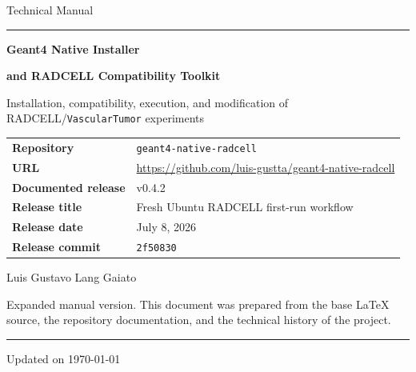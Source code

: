 \documentclass[11pt,a4paper,twoside,pdftex]{refrep}
\newcommand{\RepositoryName}{\texttt{geant4-native-radcell}}
\newcommand{\RepositoryURL}{\url{https://github.com/luis-gustta/geant4-native-radcell}}
\newcommand{\RepositoryVersion}{v0.4.2}
\newcommand{\RepositoryReleaseTitle}{Fresh Ubuntu RADCELL first-run workflow}
\newcommand{\RepositoryReleaseDate}{July 8, 2026}
\newcommand{\RepositoryReleaseCommit}{2f50830}
\begin{document}
\begin{titlepage}
  \thispagestyle{empty}

  \vspace*{1.0cm}

  \noindent\hspace*{-\leftmarginwidth}%
\begin{minipage}{\fullwidth}
{\LARGE Technical Manual\par}

\vspace{0.32cm}

\noindent\rule{\fullwidth}{0.8pt}\par
\end{minipage}

  \vspace{1.2cm}

  {\Huge\bfseries Geant4 Native Installer}

  {\Huge\bfseries and RADCELL Compatibility Toolkit}

  \vspace{0.35cm}

  {\LARGE Installation, compatibility, execution, and modification of
  RADCELL/\texttt{VascularTumor} experiments\par}

  \vspace{1.35cm}

  \noindent
  \begin{tabular}{@{}p{}p{}@{}}
    \textbf{Repository} & \RepositoryName \\
    \textbf{URL} & \RepositoryURL \\
    \textbf{Documented release} & \RepositoryVersion \\
    \textbf{Release title} & \RepositoryReleaseTitle \\
    \textbf{Release date} & \RepositoryReleaseDate \\
    \textbf{Release commit} & \texttt{\RepositoryReleaseCommit} \\
  \end{tabular}

  \vfill

  {\large Luis Gustavo Lang Gaiato}\par
  \vspace{0.35cm}
  {\small Expanded manual version. This document was prepared from the base
  LaTeX source, the repository documentation, and the technical history of the project.}\par

  \vspace{0.8cm}
  \rule{\textwidth}{0.7pt}\par
  \vspace{0.25cm}
  {\small Updated on \today}\par
\end{titlepage}
\end{document}
